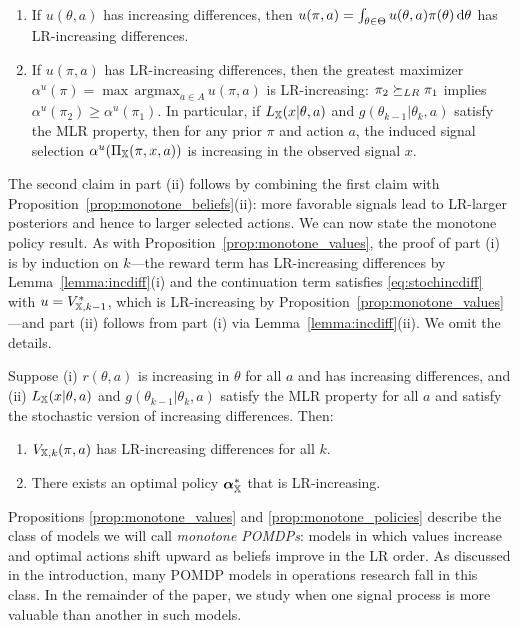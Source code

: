 \begin{lemma}\label{lemma:incdiff}\quad
\begin{enumerate}
\item If $u(\theta,a)$ has increasing differences, then
  $u(\pi,a) = \int_{\theta \in \Theta} u(\theta,a) \pi(\theta)
  \mathop{}\!\mathrm{d} \theta$ has LR-increasing differences.
\item If $u(\pi,a)$ has LR-increasing differences, then the greatest
  maximizer $\alpha^u(\pi) = \max\, \mathrm{argmax}_{a \in A}\,
  u(\pi,a)$ is LR-increasing: $\pi_2 \succeq_{LR} \pi_1$ implies
  $\alpha^u(\pi_2) \geq \alpha^u(\pi_1)$. In particular, if
  $L_{\mathbb{X}}(x|\theta,a)$ and $g(\theta_{k-1}|\theta_k,a)$ satisfy the MLR
  property, then for any prior $\pi$ and action $a$, the induced signal
  selection $\alpha^u(\Pi_{\mathbb{X}}(\pi,x,a))$ is increasing in the observed
  signal $x$.
\end{enumerate}
\end{lemma}

The second claim in part (ii) follows by combining the first claim with
Proposition~\ref{prop:monotone_beliefs}(ii): more favorable signals
lead to LR-larger posteriors and hence to larger selected actions. We
can now state the monotone policy result. As with
Proposition~\ref{prop:monotone_values}, the proof of part (i) is by
induction on $k$---the reward term has LR-increasing differences by
Lemma~\ref{lemma:incdiff}(i) and the continuation term satisfies
\eqref{eq:stochincdiff} with $u = V_{{\mathbb{X}},k-1}^*$, which is
LR-increasing by Proposition~\ref{prop:monotone_values}---and part (ii)
follows from part (i) via Lemma~\ref{lemma:incdiff}(ii). We omit the
details. 

\begin{proposition}\label{prop:monotone_policies}
Suppose (i) $r(\theta,a)$ is increasing in $\theta$ for all $a$ and has
increasing differences, and (ii) $L_{\mathbb{X}}(x|\theta,a)$ and
$g(\theta_{k-1}|\theta_k,a)$ satisfy the MLR property for all $a$ and
satisfy the stochastic version of increasing differences. Then:
\begin{enumerate}
\item $V_{{\mathbb{X}},k}(\pi,a)$ has LR-increasing differences for all $k$.
\item There exists an optimal policy $\boldsymbol{\alpha}_{{\mathbb{X}}}^*$ that
  is LR-increasing.
\end{enumerate}
\end{proposition}

Propositions \ref{prop:monotone_values} and
\ref{prop:monotone_policies} describe the class of models we will call
\emph{monotone POMDPs}: models in which values increase and optimal
actions shift upward as beliefs improve in the LR order. As discussed
in the introduction, many POMDP models in operations research fall in
this class. In the remainder of the paper, we study when one signal
process is more valuable than another in such models.
